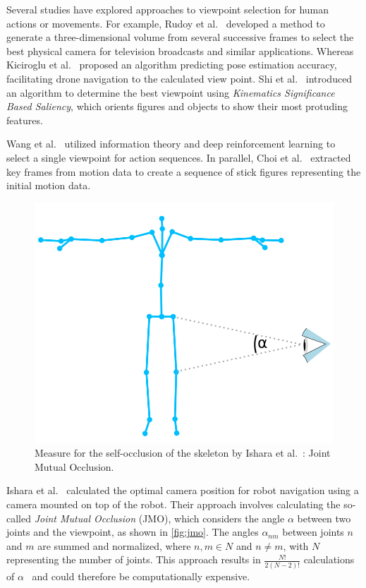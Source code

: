 Several studies have explored approaches to viewpoint selection for human actions or movements. For example, Rudoy et al.~\cite{rudoy2011vsh} developed a method to generate a three-dimensional volume from several successive frames to select the best physical camera for television broadcasts and similar applications. Whereas Kiciroglu et al.~\cite{kiciroglu2020amc} proposed an algorithm predicting pose estimation accuracy, facilitating drone navigation to the calculated view point. Shi et al.~\cite{shi2012ksb} introduced an algorithm to determine the best viewpoint using \emph{Kinematics Significance Based Saliency}, which orients figures and objects to show their most protuding features.

Wang et al.~\cite{wang2019asw} utilized information theory and deep reinforcement learning to select a single viewpoint for action sequences. In parallel, Choi et al.~\cite{choi2012rav} extracted key frames from motion data to create a sequence of stick figures representing the initial motion data.

\begin{figure}[ht]
	\centering
	\includegraphics[width=0.6\linewidth]{pictures/skeleton_E_occ.png}
	\caption[Measure for the self-occlusion of the skeleton by Ishara et al.~\cite{ishara2015mra}.]{Measure for the self-occlusion of the skeleton by Ishara et al.~\cite{ishara2015mra}: Joint Mutual Occlusion.}
	\label{fig:jmo}
\end{figure}

Ishara et al.~\cite{ishara2015mra} calculated the optimal camera position for robot navigation using a camera mounted on top of the robot. Their approach involves calculating the so-called \emph{Joint Mutual Occlusion} (JMO), which considers the angle \(\alpha\) between two joints and the viewpoint, as shown in \autoref{fig:jmo}. The angles \(\alpha_{nm}\) between joints \(n\) and \(m\) are summed and normalized, where \(n,m \in N\) and \(n \neq m\), with \(N\) representing the number of joints. This approach results in \(\frac{N!}{2(N-2)!}\) calculations of \(\alpha\)~\cite{charalambides2002enumerative} and could therefore be computationally expensive. 

